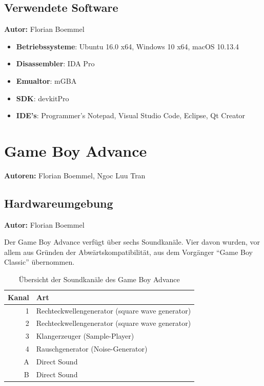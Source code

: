 \documentclass[11pt,a4paper]{scrartcl}
\newcommand{\AutorFlorian} {
    \vspace{-4mm}
    \large \textbf{Autor:} Florian Boemmel \normalsize
    \vspace{2mm}
}
\newcommand{\AutorFlorianNgoc} {
    \vspace{-4mm}
    \large \textbf{Autoren:} Florian Boemmel, Ngoc Luu Tran \normalsize
    \vspace{2mm}
}
\begin{document}
\subsection{Verwendete Software}
\AutorFlorian

\begin{itemize}
    \item \textbf{Betriebssysteme}: Ubuntu 16.0 x64, Windows 10 x64, macOS 10.13.4
    \item \textbf{Disassembler}: IDA Pro
    \item \textbf{Emualtor}: mGBA
    \item \textbf{SDK}: devkitPro
    \item \textbf{IDE's}: Programmer's Notepad, Visual Studio Code, Eclipse, Qt Creator
\end{itemize}

\newpage


\section{Game Boy Advance} \label{GameBoyAdvance}
\AutorFlorianNgoc

\subsection{Hardwareumgebung}
\AutorFlorian

Der Game Boy Advance verf\"ugt \"uber sechs Soundkan\"ale. Vier davon wurden, vor allem aus Gr\"unden der Abw\"artskompatibilit\"at, aus dem Vorg\"anger \enquote{Game Boy Classic} \"ubernommen.

\begin{table}[h]
    \centering
    \begin{tabular}{ r | p{10cm} }
        \textbf{Kanal} & \textbf{Art} \\
        \hline
        1 & Rechteckwellengenerator (square wave generator) \\
        \hline
        2 & Rechteckwellengenerator (square wave generator) \\
        \hline
        3 & Klangerzeuger (Sample-Player) \\
        \hline
        4 & Rauschgenerator (Noise-Generator) \\
        \hline
        A & Direct Sound \\
        \hline
        B & Direct Sound \\
    \end{tabular}
    \caption{\"Ubersicht der Soundkan\"ale des Game Boy Advance}
    \label{table:TechnischeDaten}
\end{table}
\end{document}
